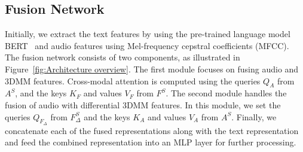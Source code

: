 \subsection{Fusion Network}\label{sec:fusion_net}
Initially, we extract the text features by using the pre-trained language model BERT~\cite{devlin2018bert} and audio features using Mel-frequency cepstral coefficients (MFCC). 
The fusion network consists of two components, as illustrated in Figure~\ref{fig:Architecture overview}. 
The first module focuses on fusing audio and 3DMM features. Cross-modal attention is computed using the queries $Q_A$ from $A^S$, and the keys $K_F$ and values $V_F$ from $F^S$. The second module handles the fusion of audio with differential 3DMM features. In this module, we set the queries $Q_{F_\Delta}$ from $F_\Delta^S$ and the keys $K_A$ and values $V_A$ from $A^S$. 
Finally, we concatenate each of the fused representations along with the text representation and feed the combined representation into an MLP layer for further processing.